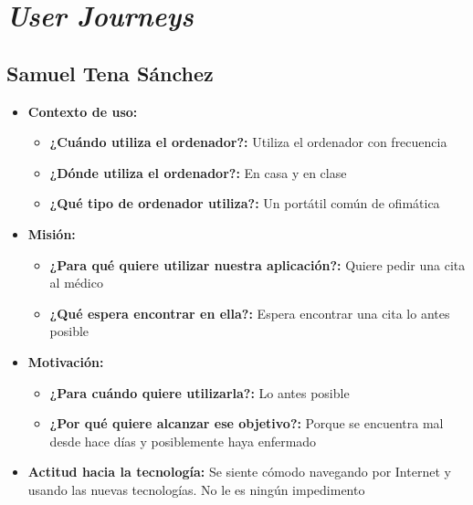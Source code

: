 \section{\textit{User Journeys}}\label{anexo}

\subsection{Samuel Tena Sánchez}
\begin{itemize}
    \item \textbf{Contexto de uso: } 
    \begin{itemize}
        \item \textbf{¿Cuándo utiliza el ordenador?: }  Utiliza el ordenador con frecuencia
        \item \textbf{¿Dónde utiliza el ordenador?: } En casa y en clase 
        \item \textbf{¿Qué tipo de ordenador utiliza?: } Un portátil común de ofimática
    \end{itemize}
    \item \textbf{Misión: } 
    \begin{itemize}
        \item \textbf{¿Para qué quiere utilizar nuestra aplicación?: } Quiere pedir una cita al médico
        \item \textbf{¿Qué espera encontrar en ella?: } Espera encontrar una cita lo antes posible 
    \end{itemize}
    \item \textbf{Motivación: } 
    \begin{itemize}
        \item \textbf{¿Para cuándo quiere utilizarla?: } Lo antes posible
        \item \textbf{¿Por qué quiere alcanzar ese objetivo?: } Porque se encuentra mal desde hace días y posiblemente haya enfermado
    \end{itemize}
    \item \textbf{Actitud hacia la tecnología: } Se siente cómodo navegando por Internet y usando las nuevas tecnologías. No le es ningún impedimento
\end{itemize}

